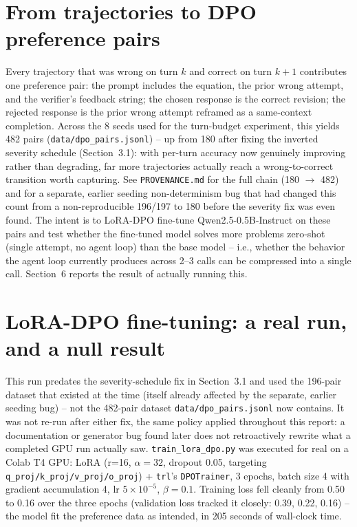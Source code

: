 \documentclass[11pt]{article}
\begin{document}
\section{From trajectories to DPO preference pairs}
Every trajectory that was wrong on turn $k$ and correct on turn $k+1$
contributes one preference pair: the prompt includes the equation, the
prior wrong attempt, and the verifier's feedback string; the chosen
response is the correct revision; the rejected response is the prior wrong
attempt reframed as a same-context completion. Across the 8 seeds used for
the turn-budget experiment, this yields 482 pairs
(\texttt{data/dpo\_pairs.jsonl}) -- up from 180 after fixing the inverted
severity schedule (Section~3.1): with per-turn accuracy now genuinely
improving rather than degrading, far more trajectories actually reach a
wrong-to-correct transition worth capturing. See \texttt{PROVENANCE.md}
for the full chain (180 $\to$ 482) and for a separate, earlier seeding
non-determinism bug that had changed this count from a non-reproducible
196/197 to 180 before the severity fix was even found. The intent
is to LoRA-DPO fine-tune Qwen2.5-0.5B-Instruct on these pairs and test
whether the fine-tuned model solves more problems zero-shot (single
attempt, no agent loop) than the base model -- i.e., whether the behavior
the agent loop currently produces across 2--3 calls can be compressed into
a single call. Section~6 reports the result of actually running this.

\section{LoRA-DPO fine-tuning: a real run, and a null result}
This run predates the severity-schedule fix in Section~3.1 and used the
196-pair dataset that existed at the time (itself already affected by the
separate, earlier seeding bug) -- not the 482-pair dataset
\texttt{data/dpo\_pairs.jsonl} now contains. It was not re-run after
either fix, the same policy applied throughout this report: a documentation
or generator bug found later does not retroactively rewrite what a
completed GPU run actually saw. \texttt{train\_lora\_dpo.py} was executed
for real on a Colab T4 GPU: LoRA (r=16, $\alpha=32$, dropout 0.05, targeting
\texttt{q\_proj/k\_proj/v\_proj/o\_proj}) + \texttt{trl}'s
\texttt{DPOTrainer}, 3 epochs, batch size 4 with gradient accumulation 4,
lr $5\times10^{-5}$, $\beta=0.1$. Training loss fell cleanly from 0.50 to
0.16 over the three epochs (validation loss tracked it closely: 0.39,
0.22, 0.16) -- the model fit the preference data as intended, in 205
seconds of wall-clock time.
\end{document}
